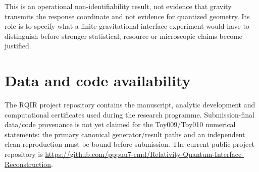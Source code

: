 \documentclass[12pt]{article}
\begin{document}
This is an operational non-identifiability result, not evidence that gravity transmits the response coordinate and not evidence for quantized geometry. Its role is to specify what a finite gravitational-interface experiment would have to distinguish before stronger statistical, resource or microscopic claims become justified.

\section*{Data and code availability}

The RQIR project repository contains the manuscript, analytic development and computational certificates used during the research programme. Submission-final data/code provenance is not yet claimed for the Toy009/Toy010 numerical statements: the primary canonical generator/result paths and an independent clean reproduction must be bound before submission. The current public project repository is \url{https://github.com/pppuu7-cmd/Relativity-Quantum-Interface-Reconstruction}.



\end{document}
